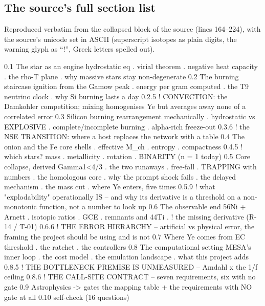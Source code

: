 \subsection{The source's full section list}
\label{app:sourcelist}

Reproduced verbatim from the collapsed  block of the source
(lines 164--224), with the source's unicode set in ASCII (superscript isotopes
as plain digits, the warning glyph as ``!'', Greek letters spelled out).

\begin{srclistingtiny}
0.1  The star as an engine        hydrostatic eq . virial theorem . negative heat
     capacity . the rho-T plane . why massive stars stay non-degenerate
0.2  The burning staircase        ignition from the Gamow peak . energy per gram
     computed . the T9 neutrino clock . why Si burning lasts a day
     0.2.5 ! CONVECTION: the Damkohler competition; mixing homogenises Ye but
           averages away none of a correlated error
0.3  Silicon burning              rearrangement mechanically . hydrostatic vs
     EXPLOSIVE . complete/incomplete burning . alpha-rich freeze-out
     0.3.6 ! the NSE TRANSITION: where a host replaces the network with a table
0.4  The onion and the Fe core    shells . effective M_ch . entropy . compactness
     0.4.5 ! which stars? mass . metallicity . rotation . BINARITY (n = 1 today)
0.5  Core collapse, derived       Gamma1<4/3 . the two runaways . free-fall .
     TRAPPING with numbers . the homologous core . why the prompt shock fails .
     the delayed mechanism . the mass cut . where Ye enters, five times
     0.5.9 ! what "explodability" operationally IS -- and why its derivative is
           a threshold on a non-monotonic function, not a number to look up
0.6  The observable end           56Ni + Arnett . isotopic ratios . GCE .
     remnants and 44Ti . ! the missing derivative (R-14 / T-01)
     0.6.6 ! THE ERROR HIERARCHY -- artificial vs physical error, the framing
           the project should be using and is not
0.7  Where Ye comes from          EC threshold . the ratchet . the controllers
0.8  The computational setting    MESA's inner loop . the cost model . the
     emulation landscape . what this project adds
     0.8.5 ! THE BOTTLENECK PREMISE IS UNMEASURED -- Amdahl x the 1/f ceiling
     0.8.6 ! THE CALL-SITE CONTRACT -- seven requirements, six with no gate
0.9  Astrophysics -> gates         the mapping table + the requirements with NO
     gate at all                  0.10 self-check (16 questions)


\end{srclistingtiny}
